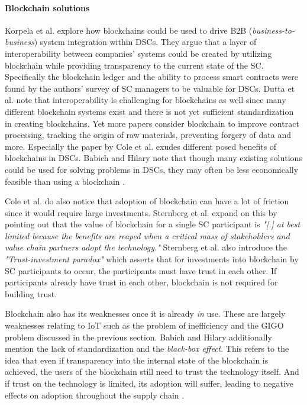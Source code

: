 \paragraph{Blockchain solutions} Korpela et al. \cite{korpelaDSC}
explore how blockchains could be used to drive B2B
(\textit{business-to-business}) system integration within DSCs. They
argue that a layer of interoperability between companies' systems
could be created by utilizing blockchain while providing transparency
to the current state of the SC. Specifically the blockchain ledger and
the ability to process smart contracts were found by the authors'
survey of SC managers to be valuable for DSCs. Dutta et al.
\cite{duttaReview} note that interoperability is challenging for
blockchains as well since many different blockchain systems exist and
there is not yet sufficient standardization in creating blockchains.
Yet more papers \cite{coleBlockchain,hackiusLogistics} consider
blockchain to improve contract processing, tracking the origin of raw
materials, preventing forgery of data and more. Especially the paper
by Cole et al. \cite{coleBlockchain} exudes different posed benefits
of blockchains in DSCs. Babich and Hilary note that though many
existing solutions could be used for solving problems in DSCs, they
may often be less economically feasible than using a blockchain
\cite{babichDistributed}.

Cole et al. do also notice that adoption of blockchain can have a lot
of friction since it would require large investments. Sternberg et al.
\cite{sternbergStruggle} expand on this by pointing out that the value
of blockchain for a single SC participant is \textit{"[.] at best
limited because the benefits are reaped when a critical mass of
stakeholders and value chain partners adopt the technology."}
Sternberg et al. also introduce the \textit{"Trust-investment
paradox"} which asserts that for investments into blockchain by SC
participants to occur, the participants must have trust in each other.
If participants already have trust in each other, blockchain is not
required for building trust. 

Blockchain also has its weaknesses once it is already \textit{in} use.
These are largely weaknesses relating to IoT such as the problem of
inefficiency and the GIGO problem discussed in the previous section.
Babich and Hilary \cite{babichDistributed} additionally mention the
lack of standardization and the \textit{black-box effect}. This refers
to the idea that even if transparency into the internal state of the
blockchain is achieved, the users of the blockchain still need to
trust the technology itself. And if trust on the technology is
limited, its adoption will suffer, leading to negative effects
on adoption throughout the supply chain \cite{sternbergStruggle}.


